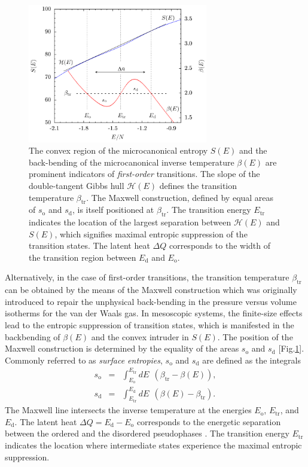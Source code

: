 \documentclass[12pt]{report}
\begin{document}
%
\begin{figure}
\center
\includegraphics[width = 0.7\textwidth]{chapter2Figs/maxwellConstruct.eps}
\caption{\label{fig:Fig_2}%
The convex region of the microcanonical entropy $S(E)$ and the back-bending of the microcanonical inverse temperature $\beta(E)$ are prominent indicators of \textit{first-order} transitions. The slope of the double-tangent Gibbs hull $\mathcal{H}(E)$ defines the transition temperature $\beta_{\mathrm{tr}}$. The Maxwell construction, defined by equal areas of $s_{\mathrm{o}}$ and $s_{\mathrm{d}}$, is itself positioned at $\beta_{\mathrm{tr}}$. The transition energy $E_{\mathrm{tr}}$ indicates the location of the largest separation between $\mathcal{H}(E)$ and $S(E)$, which signifies maximal entropic suppression of the transition states. The latent heat $\Delta Q$ corresponds to the width of the transition region between $E_{\mathrm{d}}$ and $E_{\mathrm{o}}$.}
\end{figure}
%
Alternatively, in the case of first-order transitions, the transition temperature $\beta_{\mathrm{tr}}$ can be obtained by the means of the Maxwell construction which was originally introduced to repair the unphysical back-bending in the pressure versus volume isotherms for the van der Waals gas. In mesoscopic systems, the finite-size effects lead to the entropic suppression of transition states, which is manifested in the backbending of $\beta(E)$ and the convex intruder in $S(E)$. The position of the Maxwell construction is determined by the equality of the areas $s_{\mathrm{o}}$ and $s_{\mathrm{d}}$ [Fig.\ref{fig:Fig_2}]. Commonly referred to as \textit{surface entropies}, $s_{\mathrm{o}}$ and $s_{\mathrm{d}}$ are defined as the integrals
\begin{eqnarray}
\label{eq:surfaceEntr}
s_{\mathrm{o}} &=& \int_{E_{\mathrm{o}}}^{E_{\mathrm{tr}}} dE \:\: (\beta_{\mathrm{tr}}-\beta(E)), \\
s_{\mathrm{d}} &=& \int_{E_{\mathrm{tr}}}^{E_{\mathrm{d}}} dE \:\: (\beta(E)-\beta_{\mathrm{tr}}).
\end{eqnarray}
The Maxwell line intersects the inverse temperature at the energies $E_{\mathrm{o}}$, $E_{\mathrm{tr}}$, and $E_{\mathrm{d}}$. The latent heat
$\Delta Q = E_{\mathrm{d}} - E_{\mathrm{o}}$ corresponds to the energetic separation between the ordered and the disordered pseudophases . The transition energy $E_{\mathrm{tr}}$ indicates the location where intermediate states experience the maximal entropic suppression\cite{Bachmann2014}.
\end{document}
